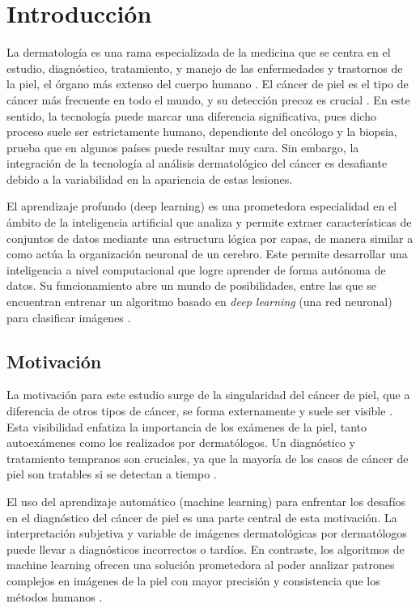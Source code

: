 \chapter*{Introducción}\label{chapter:introduction}

La dermatología es una rama especializada de la medicina que se centra en el estudio, diagnóstico, tratamiento, y manejo de las enfermedades y trastornos de la piel, el órgano más extenso del cuerpo humano . El cáncer de piel es el tipo de cáncer más frecuente en todo el mundo, y su detección precoz es crucial . En este sentido, la tecnología puede marcar una diferencia significativa, pues dicho proceso suele ser estrictamente humano, dependiente del oncólogo y la biopsia, prueba que en algunos países puede resultar muy cara. Sin embargo, la integración de la tecnología al análisis dermatológico del cáncer es desafiante debido a la variabilidad en la apariencia de estas lesiones.

El aprendizaje profundo (deep learning) es una prometedora especialidad en el ámbito de la inteligencia artificial que analiza y permite extraer características de conjuntos de datos mediante una estructura lógica por capas, de manera similar a como actúa la organización neuronal de un cerebro. Este permite desarrollar una inteligencia a nivel computacional que logre aprender de forma autónoma de datos. Su funcionamiento abre un mundo de posibilidades, entre las que se encuentran entrenar un algoritmo basado en \textit{deep learning} (una red neuronal) para clasificar imágenes .

\section*{Motivación}

La motivación para este estudio surge de la singularidad del cáncer de piel, que a diferencia de otros tipos de cáncer, se forma externamente y suele ser visible . Esta visibilidad enfatiza la importancia de los exámenes de la piel, tanto autoexámenes como los realizados por dermatólogos. Un diagnóstico y tratamiento tempranos son cruciales, ya que la mayoría de los casos de cáncer de piel son tratables si se detectan a tiempo .

El uso del aprendizaje automático (machine learning) para enfrentar los desafíos en el diagnóstico del cáncer de piel es una parte central de esta motivación. La interpretación subjetiva y variable de imágenes dermatológicas por dermatólogos puede llevar a diagnósticos incorrectos o tardíos. En contraste, los algoritmos de machine learning ofrecen una solución prometedora al poder analizar patrones complejos en imágenes de la piel con mayor precisión y consistencia que los métodos humanos .

